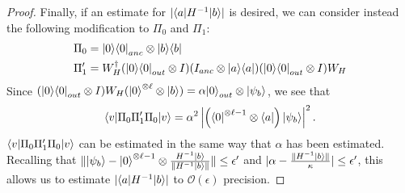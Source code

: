 \documentclass[11pt]{article}
\theoremstyle{definition}
\theoremstyle{remark}
\newcommand\bigoh{\mathcal{O}}
\begin{document}
\begin{proof}
Finally, if an estimate for $|\bra{a} H^{-1} \ket{b}|$ is desired, we can consider instead the following modification to $\Pi_0$ and $\Pi_1$:
\begin{align}
\Pi_0 &= \ket{0}\bra{0}_{anc} \otimes \ket{b}\bra{b} \\
\Pi'_1 &= W_H^\dagger (\ket{0}\bra{0}_{out} \otimes I) (I_{anc} \otimes \ket{a}\bra{a})(\ket{0}\bra{0}_{out} \otimes I) W_H
\end{align}
Since $(\ket{0}\bra{0}_{out} \otimes I) W_H (\ket{0}^{\otimes \ell} \otimes \ket{b}) = \alpha \ket{0}_{out} \otimes \ket{\psi_b}$, we see that 
\begin{equation}
\bra{v}\Pi_0\Pi_1'\Pi_0\ket{v} = \alpha^2\left|\left(\bra{0}^{\otimes \ell-1} \otimes \bra{a}\right) \ket{\psi_b}\right|^2.
\end{equation}
$\bra{v}\Pi_0\Pi_1'\Pi_0\ket{v}$ can be estimated in the same way that $\alpha$ has been estimated. Recalling that $\| \ket{\psi_b} - \ket{0}^{\otimes \ell-1} \otimes \frac{H^{-1}\ket{b}} {\|H^{-1}\ket{b}\|} \| \le \epsilon'$ and $|\alpha - \frac{\|H^{-1}\ket{b}\|}{\kappa}| \le \epsilon'$, this allows us to estimate $|\bra{a} H^{-1} \ket{b}|$ to $\bigoh (\epsilon)$ precision.
\end{proof}




\end{document}

